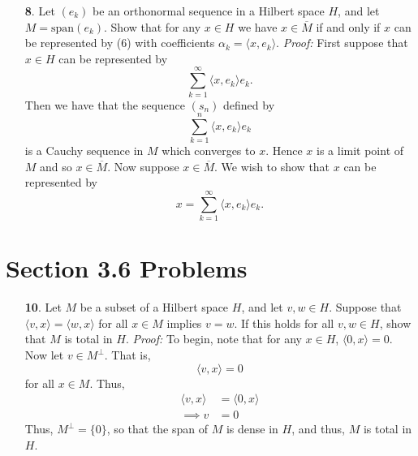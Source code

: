 \documentclass{article}
\begin{document}
\begin{itemize}
    \item[\textbf{8}.] Let $(e_k)$ be an orthonormal sequence in a Hilbert space $H$, and let $M = \text{span}(e_k)$. Show that for any $x \in H$ we have $x \in \overline{M}$ if and only if $x$ can be represented by (6) with coefficients $\alpha_k = \langle x, e_k \rangle$.
    \newline\newline
    \textit{Proof:} First suppose that $x \in H$ can be represented by
    \[\sum_{k = 1}^{\infty}\langle x, e_k \rangle e_k.\]
    Then we have that the sequence $(s_n)$ defined by
    \[\sum_{k = 1}^n \langle x, e_k \rangle e_k\]
    is a Cauchy sequence in $M$ which converges to $x$. Hence $x$ is a limit point of $M$ and so $x \in \overline{M}$.
    \newline
    Now suppose $x \in \overline{M}$. We wish to show that $x$ can be represented by
    \[x = \sum_{k = 1}^{\infty} \langle x, e_k \rangle e_k.\]
    
\end{itemize}


\section*{Section 3.6 Problems}
\begin{itemize}
    \item[\textbf{10}.] Let $M$ be a subset of a Hilbert space $H$, and let $v, w \in H$. Suppose that $\langle v, x\rangle = \langle w, x \rangle$ for all $x \in M$ implies $v = w$. If this holds for all $v, w \in H$, show that $M$ is total in $H$.
    \newline\newline
    \textit{Proof:} To begin, note that for any $x \in H$, $\langle 0, x\rangle = 0$. Now let $v \in M^{\perp}$. That is,
    \[\langle v,x\rangle = 0\]
    for all $x\in M$. Thus,
    \begin{align*}
        \langle v,x \rangle &= \langle 0, x \rangle\\
        \implies v &= 0
    \end{align*}
    Thus, $M^{\perp} = \{0\}$, so that the span of $M$ is dense in $H$, and thus, $M$ is total in $H$.    
\end{itemize}
\end{document}
